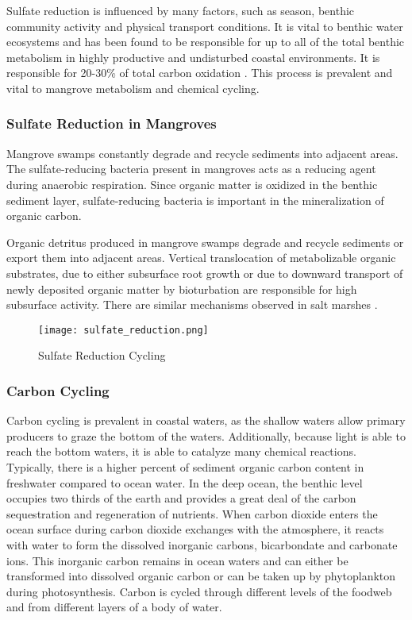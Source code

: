 Sulfate reduction is influenced by many factors, such as season, benthic community activity and physical transport conditions. It is vital to benthic water ecosystems and has been found to be responsible for up to all of the total benthic metabolism in highly productive and undisturbed coastal environments. It is responsible for 20-30\% of total carbon oxidation \citep{kristensen2000carbon}. This process is prevalent and vital to mangrove metabolism and chemical cycling. 

\subsubsection{Sulfate Reduction in Mangroves}

Mangrove swamps constantly degrade and recycle sediments into adjacent areas. The sulfate-reducing bacteria present in mangroves acts as a reducing agent during anaerobic respiration. Since organic matter is oxidized in the benthic sediment layer, sulfate-reducing bacteria is important in the mineralization of organic carbon. 

Organic detritus produced in mangrove swamps degrade and recycle sediments or export them into adjacent areas. Vertical translocation of metabolizable organic substrates, due to either subsurface root growth or due to downward transport of newly deposited organic matter by bioturbation are responsible for high subsurface activity. There are similar mechanisms observed in salt marshes \citep{kristensen1991benthic}.

\begin{figure}[!ht]
        \centering
        \texttt{[image: sulfate\_reduction.png]}
        \caption{Sulfate Reduction Cycling}
        \label{fig:Sulfate Reduction}
\end{figure}

\subsubsection{Carbon Cycling}

Carbon cycling is prevalent in coastal waters, as the shallow waters allow primary producers to graze the bottom of the waters. Additionally, because light is able to reach the bottom waters, it is able to catalyze many chemical reactions. Typically, there is a higher percent of sediment organic carbon content in freshwater compared to ocean water. In the deep ocean, the benthic level occupies two thirds of the earth and provides a great deal of the carbon sequestration and regeneration of nutrients. When carbon dioxide enters the ocean surface during carbon dioxide exchanges with the atmosphere, it reacts with water to form the dissolved inorganic carbons, bicarbondate and carbonate ions. This inorganic carbon remains in ocean waters and can either be transformed into dissolved organic carbon or can be taken up by phytoplankton during photosynthesis. Carbon is cycled through different levels of the foodweb and from different layers of a body of water.  

